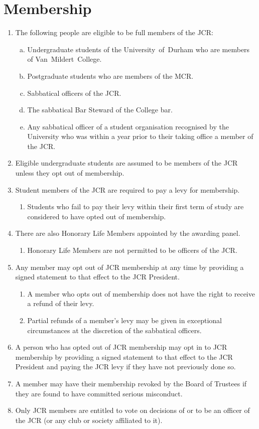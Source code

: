 \documentclass[12pt]{article}
\begin{document}
\section{Membership}
\begin{enumerate}
    \item The following people are eligible to be full members of the JCR:
    \begin{enumerate}[(a)]
        \item Undergraduate students of the University~of~Durham who are members of Van~Mildert~College.
        \item Postgraduate students who are members of the MCR.
        \item Sabbatical officers of the JCR.
        \item The sabbatical Bar Steward of the College bar.
        \item Any sabbatical officer of a student organisation recognised by the University who was within a year prior to their taking office a member of the JCR.
    \end{enumerate}
    \item Eligible undergraduate students are assumed to be members of the JCR unless they opt out of membership.
    \item Student members of the JCR are required to pay a levy for membership.
    \begin{enumerate}
        \item Students who fail to pay their levy within their first term of study are considered to have opted out of membership.
    \end{enumerate}
    \item There are also Honorary Life Members appointed by the awarding panel.
    \begin{enumerate}
        \item Honorary Life Members are not permitted to be officers of the JCR.
    \end{enumerate}
    \item Any member may opt out of JCR membership at any time by providing a signed statement to that effect to the JCR President.
    \begin{enumerate}
        \item A member who opts out of membership does not have the right to receive a refund of their levy.
        \item Partial refunds of a member's levy may be given in exceptional circumstances at the discretion of the sabbatical officers.
    \end{enumerate}
    \item A person who has opted out of JCR membership may opt in to JCR membership by providing a signed statement to that effect to the JCR President and paying the JCR levy if they have not previously done so.
    \item A member may have their membership revoked by the Board of Trustees if they are found to have committed serious misconduct.
    \item Only JCR members are entitled to vote on decisions of or to be an officer of the JCR (or any club or society affiliated to it).
\end{enumerate}
\newpage
\end{document}
